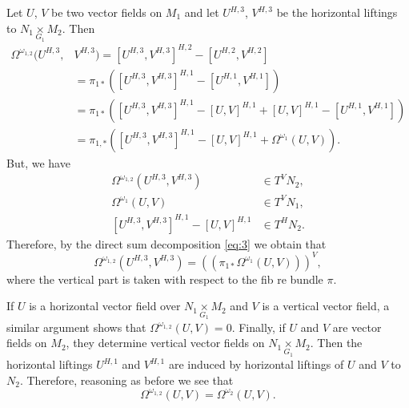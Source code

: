 \documentclass[10pt,twoside]{article}
\numberwithin{equation}{section}
\theoremstyle{plain}
\theoremstyle{definition}
\begin{document}
Let $U$, $V$ be two vector fields on $M_{1}$ and let $U^{H,3}$,
$V^{H,3}$ be the horizontal liftings to $N_{1}\underset{G_{1}}{\times
}M_{2}$. Then 
\begin{align*}
  \Omega ^{\omega _{1,2}}(U^{H,3},&V^{H,3})=[U^{H,3},V^{H,3}]^{H,2}-
  [U^{H,2},V^{H,2}]\\
  &=\pi_{1\ast}([U^{H,3},V^{H,3}]^{H,1}-
  [U^{H,1},V^{H,1}])\\
  &= \pi_{1\ast}([U^{H,3},V^{H,3}]^{H,1}-
  [U,V]^{H,1}+ [U,V]^{H,1}-
  [U^{H,1},V^{H,1}])\\
  &=\pi_{1,\ast}([U^{H,3},V^{H,3}]^{H,1}-
  [U,V]^{H,1}+\Omega ^{\omega _{1}}(U,V)).
\end{align*}
But, we have
\begin{align*}
  \Omega ^{\omega _{1,2}}(U^{H,3},V^{H,3})&\in T^{V}N_{2},\\
  \Omega ^{\omega _{1}}(U,V)&\in T^{V}N_{1},\\
  [U^{H,3},V^{H,3}]^{H,1}- [U,V]^{H,1}&\in T^{H}N_{2}. 
\end{align*}
Therefore, by the direct sum decomposition \eqref{eq:3} we obtain that 
\begin{displaymath}
  \Omega ^{\omega _{1,2}}(U^{H,3},V^{H,3})=((\pi_{1\ast} \Omega ^{\omega
    _{1}}(U,V)))^{V},
\end{displaymath}
where the vertical part is taken with respect to the fib re bundle
$\pi$.

If $U$ is a horizontal vector field over
$N_{1}\underset{G_{1}}{\times}M_{2}$ and $V$ is a vertical vector field, a
similar argument shows that $\Omega ^{\omega _{1,2}}(U,V)=0$. Finally,
if $U$ and $V$ are vector fields on $M_{2}$, they determine vertical
vector fields on $N_{1}\underset{G_{1}}{\times}M_{2}$. Then the
horizontal liftings $U^{H,1}$ and $V^{H,1}$ are induced by
horizontal liftings of $U$ and $V$ to $N_{2}$. Therefore, reasoning as
before we see that
\begin{displaymath}
  \Omega^{\omega _{1,2}}(U,V)=\Omega ^{\omega _{2}}(U,V).
\end{displaymath}
\end{document}
